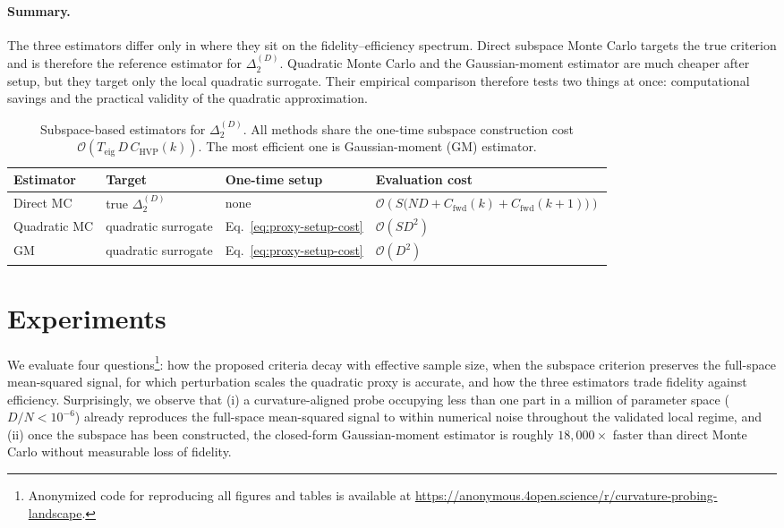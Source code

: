 \documentclass{article}
\begin{document}
\paragraph{Summary.}
The three estimators differ only in where they sit on the fidelity--efficiency spectrum.
Direct subspace Monte Carlo targets the true criterion and is therefore the reference estimator for $\Delta_2^{(D)}$.
Quadratic Monte Carlo and the Gaussian-moment estimator are much cheaper after setup, but they target only the local quadratic surrogate.
Their empirical comparison therefore tests two things at once: computational savings and the practical validity of the quadratic approximation.

\begin{table}[t]
\caption{Subspace-based estimators for $\Delta_2^{(D)}$. All methods share the one-time subspace construction cost $\mathcal O(T_{\mathrm{eig}}\,D\,C_{\mathrm{HVP}}(k))$. The most efficient one is Gaussian-moment (GM) estimator.}
\label{tab:estimator-summary}
\begin{center}
\small
\begin{tabular}{p{1.8cm} p{2.4cm} p{2.1cm} p{5.0cm}}
\toprule
\textbf{Estimator} & \textbf{Target} & \textbf{One-time setup} & \textbf{Evaluation cost} \\
\midrule
Direct MC
&
true $\Delta_2^{(D)}$
&
none
&
$\mathcal O \left(S\bigl(ND + C_{\mathrm{fwd}}(k)+C_{\mathrm{fwd}}(k+1)\bigr)\right)$
\\[0.45em]

Quadratic MC
&
quadratic surrogate
&
Eq.~\eqref{eq:proxy-setup-cost}
&
$\mathcal O(SD^2)$
\\[0.45em]

GM
&
quadratic surrogate
&
Eq.~\eqref{eq:proxy-setup-cost}
&
$\mathcal O(D^2)$
\\
\bottomrule
\end{tabular}
\end{center}
\vspace{-1.4\baselineskip}
\end{table}

\section{Experiments}\label{sec:experiments}

We evaluate four questions\footnote{Anonymized code for reproducing all figures and tables is available at \url{https://anonymous.4open.science/r/curvature-probing-landscape}.}: how the proposed criteria decay with effective sample size, when the subspace criterion preserves the full-space mean-squared signal, for which perturbation scales the quadratic proxy is accurate, and how the three estimators trade fidelity against efficiency. Surprisingly, we observe that (i) a curvature-aligned probe occupying less than one part in a million of parameter space ($D/N < 10^{-6}$) already reproduces the full-space mean-squared signal to within numerical noise throughout the validated local regime, and (ii) once the subspace has been constructed, the closed-form Gaussian-moment estimator is roughly $18{,}000\times$ faster than direct Monte Carlo without measurable loss of fidelity.
\end{document}
